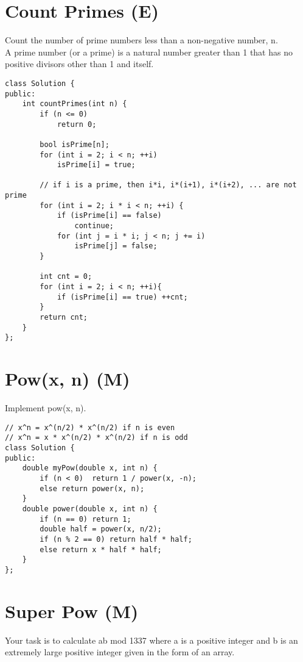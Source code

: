 \section{Count Primes (E)}
Count the number of prime numbers less than a non-negative number, n. \\
A prime number (or a prime) is a natural number greater than 1 that has no positive divisors other than 1 and itself. \\

\begin{lstlisting}
class Solution {
public:
    int countPrimes(int n) {
        if (n <= 0) 
            return 0;
        
        bool isPrime[n];
        for (int i = 2; i < n; ++i)
            isPrime[i] = true;
            
        // if i is a prime, then i*i, i*(i+1), i*(i+2), ... are not prime
        for (int i = 2; i * i < n; ++i) {
            if (isPrime[i] == false)    
                continue;
            for (int j = i * i; j < n; j += i)  
                isPrime[j] = false;
        }
        
        int cnt = 0;
        for (int i = 2; i < n; ++i){
            if (isPrime[i] == true) ++cnt;
        }
        return cnt;
    }
};
\end{lstlisting}


\section{Pow(x, n) (M)}
Implement pow(x, n). \\

\begin{lstlisting}
// x^n = x^(n/2) * x^(n/2) if n is even
// x^n = x * x^(n/2) * x^(n/2) if n is odd
class Solution {
public:
    double myPow(double x, int n) {
        if (n < 0)  return 1 / power(x, -n);
        else return power(x, n);
    }
    double power(double x, int n) {
        if (n == 0) return 1;
        double half = power(x, n/2);
        if (n % 2 == 0) return half * half;
        else return x * half * half;
    }
};
\end{lstlisting}


\section{Super Pow (M)}
Your task is to calculate ab mod 1337 where a is a positive integer and b is an extremely large positive integer given in the form of an array. \\
 
